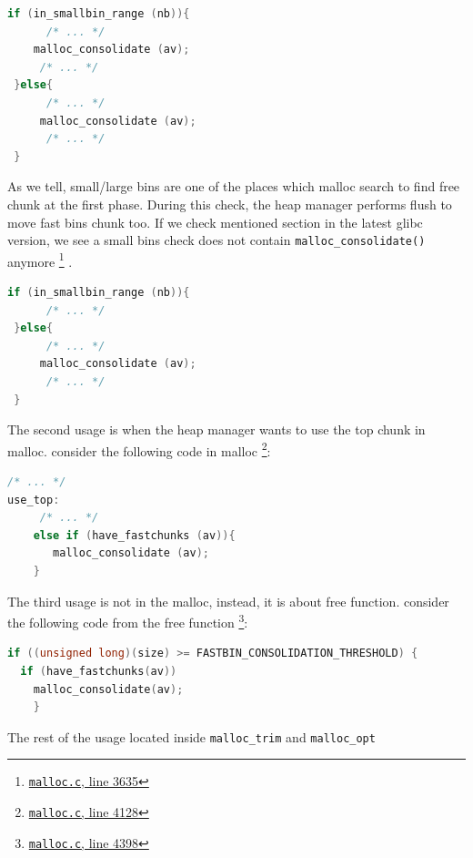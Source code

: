 \documentclass{masterthesis}
\newcommand*\libc{glibc}
\newcommand*\fb{fast bins}
\newcommand*\lb{large bins}
\newcommand*\sbs{small bins}
\begin{document}
\begin{lstlisting}[language=c,frame=tlrb]
 if (in_smallbin_range (nb)){
	  /* ... */ 
 	malloc_consolidate (av);
	 /* ... */ 
 }else{
	  /* ... */ 
	 malloc_consolidate (av);
	  /* ... */ 
 }
\end{lstlisting}

As we tell, small/\lb{} are one of the places which malloc search to find free chunk at the first phase. During this check, the heap manager performs flush to move \fb{} chunk too. If we check mentioned section in the latest \libc{} version, we see a \sbs{} check does not contain \lstinline{malloc_consolidate()} anymore \footnote{\href{https://sourceware.org/git/?p=glibc.git;a=blob;f=malloc/malloc.c;h=f7cd29bc2f93e1082ee77800bd64a4b2a2897055;hb=9ea3686266dca3f004ba874745a4087a89682617\#l3635}{\texttt{malloc.c}, line 3635}} .

\begin{lstlisting}[language=c,frame=tlrb]
 if (in_smallbin_range (nb)){
 	  /* ... */ 
 }else{
	  /* ... */ 
	 malloc_consolidate (av);
	  /* ... */ 
 }
\end{lstlisting}

The second usage is when the heap manager wants to use the top chunk in malloc. consider the following code in malloc \footnote{\href{https://sourceware.org/git/?p=glibc.git;a=blob;f=malloc/malloc.c;h=f7cd29bc2f93e1082ee77800bd64a4b2a2897055;hb=9ea3686266dca3f004ba874745a4087a89682617\#l4128}{\texttt{malloc.c}, line 4128}}:

\begin{lstlisting}[language=c,frame=tlrb]
 /* ... */ 
use_top:
	 /* ... */ 
	else if (have_fastchunks (av)){
	   malloc_consolidate (av);
	}
\end{lstlisting}

The third usage is not in the malloc, instead, it is about free function. consider the following code from the free function \footnote{\href{https://sourceware.org/git/?p=glibc.git;a=blob;f=malloc/malloc.c;h=f7cd29bc2f93e1082ee77800bd64a4b2a2897055;hb=9ea3686266dca3f004ba874745a4087a89682617\#l4398}{\texttt{malloc.c}, line 4398}}:

\begin{lstlisting}[language=c,frame=tlrb]
if ((unsigned long)(size) >= FASTBIN_CONSOLIDATION_THRESHOLD) {
  if (have_fastchunks(av))
	malloc_consolidate(av);
	}
\end{lstlisting}

The rest of the usage located inside \lstinline{malloc_trim} and \lstinline{malloc_opt}
\end{document}
